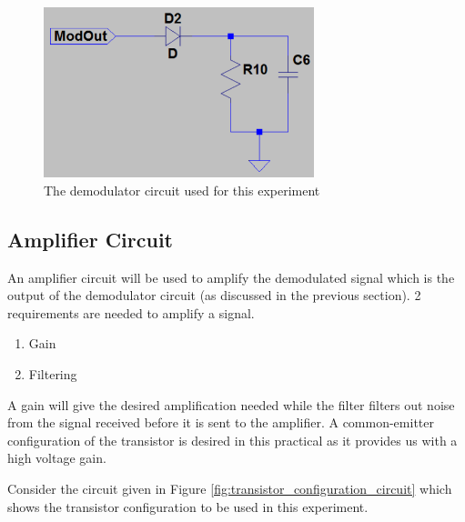 \documentclass[12pt, a4paper]{article}
\begin{document}
		\begin{figure}[H]
			\centering
			\includegraphics[width=0.7\textwidth]{images/Demodulator_circuit.png}
			\caption{The demodulator circuit used for this experiment}
			\label{fig:demodulator_circuit}
		\end{figure}

	\subsection{Amplifier Circuit} %
	\label{sub:amplifier_circuit}
	 An amplifier circuit will be used to amplify the demodulated signal which is the output of the demodulator circuit (as discussed in the previous section). 2 requirements are needed to amplify a signal.
	 \begin{enumerate}
	 	\item Gain
	 	\item Filtering
	 \end{enumerate}

	 A gain will give the desired amplification needed while the filter filters out noise from the signal received before it is sent to the amplifier. A common-emitter configuration of the transistor is desired in this practical as it provides us with a high voltage gain. 

	 Consider the circuit given in Figure \ref{fig:transistor_configuration_circuit} which shows the transistor configuration to be used in this experiment.
\end{document}
